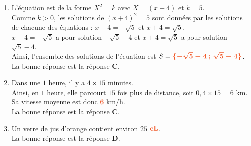 \documentclass[a4paper,11pt]{article}
\begin{document}
\begin{seanceD}{}
\begin{enumerate}
\medskip
La bonne réponse est la réponse {\bfseries \color[HTML]{F15929}B}.

\item L'équation est de la forme $X^2=k$ avec $X=(x+4)$ et $k=5$.\\
        Comme $k>0$, les solutions de $(x+4)^2=5$ sont données par les solutions de chacune des équations :         $x+4=-\sqrt{5}$ et $x+4=\sqrt{5}$.\\
        $x+4=-\sqrt{5}$ a pour solution $-\sqrt{5}-4$ et 
        $x+4=\sqrt{5}$ a pour solution $\sqrt{5}-4$.\\
        Ainsi, l'ensemble des solutions de l'équation est $S={\color[HTML]{F15929}\boldsymbol{\{-\sqrt{5}-4\,;\,\sqrt{5}-4\}}}$.
         \\La bonne réponse est la réponse {\bfseries \color[HTML]{F15929}C}.

\item Dans une $1$ heure, il y a $4\times 15$ minutes.\\
    Ainsi, en $1$ heure, elle parcourt $15$ fois plus de distance, soit $0{,}4\times 15=6\text{ km}$.\\
    Sa vitesse moyenne est donc ${\color[HTML]{F15929}\boldsymbol{6}}\text{ km/h}$. \\La bonne réponse est la réponse {\bfseries \color[HTML]{F15929}C}.

\item Un verre de jus d'orange contient environ $25$ ${\color[HTML]{F15929}\boldsymbol{\textbf{cL}}}$.\\La bonne réponse est la réponse {\bfseries \color[HTML]{F15929}D}.

\end{enumerate}

\end{seanceD}
\end{document}
